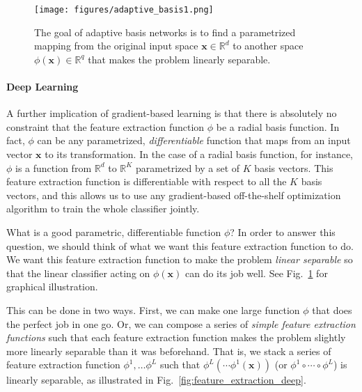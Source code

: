\documentclass{report}
\newcommand{\vect}[1]{\mathbf{#1}}
\newcommand{\vx}[0]{\vect{x}}
\newcommand{\RR}[0]{\mathbb{R}}
\begin{document}
\begin{figure}
    \centering
    \begin{minipage}{0.6\textwidth}
        \centering
        \texttt{[image: figures/adaptive\_basis1.png]}
    \end{minipage}
    \begin{minipage}{0.39\textwidth}
        \caption{
            \label{fig:feature_extraction}
            The goal of adaptive basis networks is to find a parametrized
            mapping from the original input space $\vx \in \mathbb{R}^d$ to
            another space $\phi(\vx) \in \mathbb{R}^q$ that makes the problem
            linearly separable. 
        }
    \end{minipage}
\end{figure}


\paragraph{Deep Learning}

A further implication of gradient-based learning is that there is absolutely no
constraint that the feature extraction function $\phi$ be a radial basis
function. In fact, $\phi$ can be any parametrized, {\it differentiable} function
that maps from an input vector $\vx$ to its transformation. In the case of a
radial basis function, for instance, $\phi$ is a function from $\RR^d$ to
$\RR^K$ parametrized by a set of $K$ basis vectors. This feature extraction
function is differentiable with respect to all the $K$ basis vectors, and this
allows us to use any gradient-based off-the-shelf optimization algorithm to
train the whole classifier jointly.

What is a good parametric, differentiable function $\phi$? In order to answer
this question, we should think of what we want this feature extraction function
to do. We want this feature extraction function to make the problem {\it linear
separable} so that the linear classifier acting on $\phi(\vx)$ can do its job
well. See Fig.~\ref{fig:feature_extraction} for graphical illustration. 

This can be done in two ways. First, we can make one large function $\phi$ that
does the perfect job in one go. Or, we can compose a series of {\it simple
feature extraction functions} such that each feature extraction function makes
the problem slightly more linearly separable than it was beforehand. That is, we
stack a series of feature extraction function $\phi^1, \ldots \phi^L$ such that
$\phi^L(\cdots\phi^1(\vx))$ (or $\phi^1 \circ \cdots \circ \phi^L$) is linearly
separable, as illustrated in Fig.~\ref{fig:feature_extraction_deep}.
\end{document}
